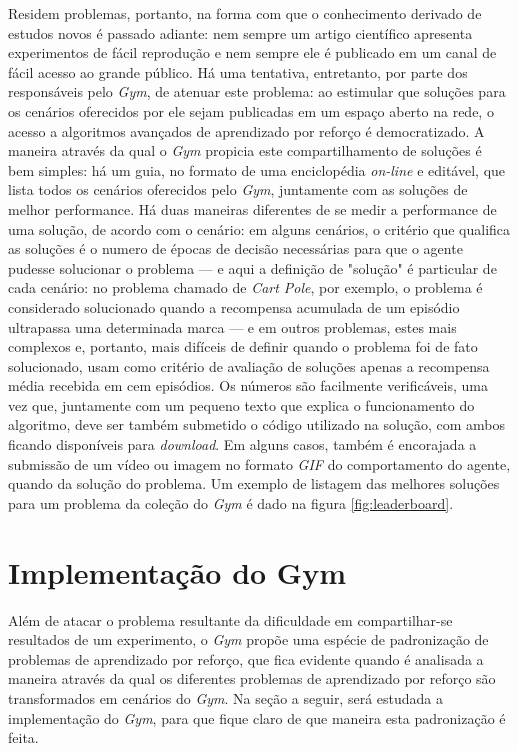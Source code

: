\documentclass[cic,tc]{iiufrgs}
\begin{document}
Residem problemas, portanto, na forma com que o conhecimento derivado de estudos
novos é passado adiante: nem sempre um artigo científico apresenta experimentos
de fácil reprodução e nem sempre ele é publicado em um canal de fácil acesso ao
grande público. Há uma tentativa, entretanto, por parte dos responsáveis pelo
\textit{Gym}, de atenuar este problema: ao estimular que soluções para os
cenários oferecidos por ele sejam publicadas em um espaço aberto na rede, o
acesso a algoritmos avançados de aprendizado por reforço é democratizado. A
maneira através da qual o \textit{Gym} propicia este compartilhamento de
soluções é bem simples: há um guia, no formato de uma enciclopédia
\textit{on-line} e editável, que lista todos os cenários oferecidos pelo
\textit{Gym}, juntamente com as soluções de melhor performance. Há duas maneiras
diferentes de se medir a performance de uma solução, de acordo com o cenário:
em alguns cenários, o critério que qualifica as soluções é o numero de épocas de
decisão necessárias para que o agente pudesse solucionar o problema --- e aqui
a definição de "solução" é particular de cada cenário: no problema chamado de
\textit{Cart Pole}, por exemplo, o problema é considerado solucionado quando a
recompensa acumulada de um episódio ultrapassa uma determinada marca --- e em
outros problemas, estes mais complexos e, portanto, mais difíceis de definir
quando o problema foi de fato solucionado, usam como critério de avaliação de
soluções apenas a recompensa média recebida em cem episódios. Os números são
facilmente verificáveis, uma vez que, juntamente com um pequeno texto que
explica o funcionamento do algoritmo, deve ser também submetido o código
utilizado na solução, com ambos ficando disponíveis para \textit{download}. Em
alguns casos, também é encorajada a submissão de um vídeo ou imagem no formato
\textit{GIF} do comportamento do agente, quando da solução do problema. Um
exemplo de listagem das melhores soluções para um problema da coleção do
\textit{Gym} é dado na figura \ref{fig:leaderboard}.


\section{Implementação do Gym}

Além de atacar o problema resultante da dificuldade em compartilhar-se
resultados de um experimento, o \textit{Gym} propõe uma espécie de padronização
de problemas de aprendizado por reforço, que fica evidente quando é analisada a
maneira através da qual os diferentes problemas de aprendizado por reforço são
transformados em cenários do \textit{Gym}. Na seção a seguir, será estudada a
implementação do \textit{Gym}, para que fique claro de que maneira esta
padronização é feita.
\end{document}
